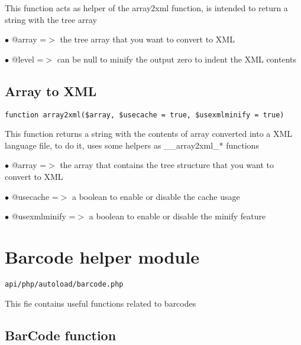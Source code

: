 \documentclass[a4paper]{book}
\begin{document}
This function acts as helper of the array2xml function, is intended to
return a string with the tree array

\begin{compactitem}
\item[\color{myblue}$\bullet$] @array =$>$ the tree array that you want to convert to XML
\item[\color{myblue}$\bullet$] @level =$>$ can be null to minify the output zero to indent the XML contents
\end{compactitem}

\hypertarget{toc41}{}
\subsection{Array to XML}

\begin{lstlisting}
function array2xml($array, $usecache = true, $usexmlminify = true)
\end{lstlisting}

This function returns a string with the contents of array converted into a XML
language file, to do it, uses some helpers as \_\_array2xml\_* functions

\begin{compactitem}
\item[\color{myblue}$\bullet$] @array        =$>$ the array that contains the tree structure that you want to convert to XML
\item[\color{myblue}$\bullet$] @usecache     =$>$ a boolean to enable or disable the cache usage
\item[\color{myblue}$\bullet$] @usexmlminify =$>$ a boolean to enable or disable the minify feature
\end{compactitem}

\hypertarget{toc42}{}
\section{Barcode helper module}

\begin{lstlisting}
api/php/autoload/barcode.php
\end{lstlisting}

This fie contains useful functions related to barcodes

\hypertarget{toc43}{}
\subsection{BarCode function}
\end{document}

